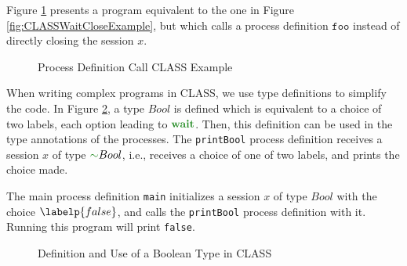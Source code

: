 Figure \ref{fig:CLASSProcDefExample} presents a program equivalent to the one in Figure \ref{fig:CLASSWaitCloseExample}, but which calls a process definition $\texttt{foo}$ instead of directly closing the session $x$.

\begin{figure}[H]
    \centering
    \begin{class}
        \z\z
    \end{class}
    \caption{Process Definition Call CLASS Example}
    \label{fig:CLASSProcDefExample}
\end{figure}

When writing complex programs in CLASS, we use type definitions to simplify the code. In Figure \ref{fig:CLASSBoolExample}, a type $Bool$ is defined which is equivalent to a choice of two labels, each option leading to $\waitt$. Then, this definition can be used in the type annotations of the processes. The \texttt{printBool} process definition receives a session $x$ of type $\dualt{Bool}$, i.e., receives a choice of one of two labels, and prints the choice made.

The main process definition \texttt{main} initializes a session $x$ of type $Bool$ with the choice $\labelp{false}$, and calls the \texttt{printBool} process definition with it. Running this program will print \texttt{false}.

\begin{figure}[H]
    \centering
    \begin{minipage}{0.45\textwidth}
        \begin{class}
            \z\z
        \end{class}
    \end{minipage}
    \hfill
    \begin{minipage}{0.45\textwidth}
        \begin{class}
        \end{class}
    \end{minipage}
    \caption{Definition and Use of a Boolean Type in CLASS}
    \label{fig:CLASSBoolExample}
\end{figure}

